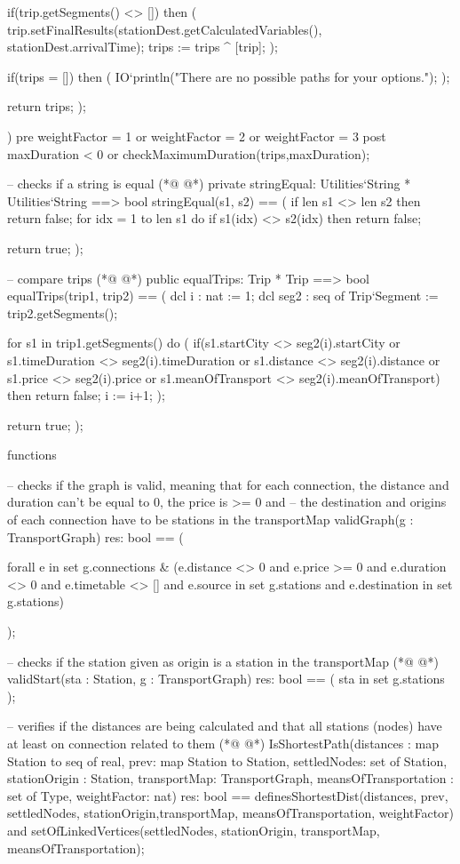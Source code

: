 \begin{vdmpp}[breaklines=true]
   if(trip.getSegments() <> []) then (
      trip.setFinalResults(stationDest.getCalculatedVariables(), stationDest.arrivalTime);
     trips := trips ^ [trip];
   );
   
   if(trips = []) then (
     IO`println("There are no possible paths for your options."); 
   );
   
   return trips;
  );
  
 )
 pre weightFactor = 1 or weightFactor = 2 or weightFactor = 3
 post maxDuration < 0 or checkMaximumDuration(trips,maxDuration);
 
 -- checks if a string is equal
(*@
\label{stringEqual:474}
@*)
 private stringEqual: Utilities`String * Utilities`String ==> bool
 stringEqual(s1, s2) ==
 (
  if len s1 <> len s2 then
   return false;
  for idx = 1 to len s1 do
   if s1(idx) <> s2(idx) then return false;
  
  return true;
 );
 
 -- compare trips
(*@
\label{equalTrips:486}
@*)
 public equalTrips: Trip * Trip ==> bool
 equalTrips(trip1, trip2) == (
   dcl i : nat := 1;
   dcl seg2 : seq of Trip`Segment := trip2.getSegments();
   
   for s1 in trip1.getSegments() do (
     if(s1.startCity <> seg2(i).startCity or s1.timeDuration <> seg2(i).timeDuration or s1.distance <> seg2(i).distance or s1.price <> seg2(i).price or s1.meanOfTransport <> seg2(i).meanOfTransport) then
       return false;
     i := i+1;
   );
   
   return true;
 );
 
 
functions
 
 -- checks if the graph is valid, meaning that for each connection, the distance and duration can't be equal to 0, the price is >= 0 and
 -- the destination and origins of each connection have to be stations in the transportMap
 validGraph(g : TransportGraph) res: bool ==
 (
  
  forall e in set g.connections & (e.distance <> 0 and e.price >= 0 and e.duration <> 0 and e.timetable <> [] 
  and e.source in set g.stations and e.destination in set g.stations)
  
 );
 
 -- checks if the station given as origin is a station in the transportMap
(*@
\label{validStart:514}
@*)
 validStart(sta : Station, g : TransportGraph) res: bool ==
 (
  sta in set g.stations
 );
 
 -- verifies if the distances are being calculated and that all stations (nodes) have at least on connection related to them
(*@
\label{IsShortestPath:520}
@*)
 IsShortestPath(distances : map Station to seq of real, prev: map Station to Station, settledNodes: set of Station, stationOrigin : Station, transportMap: TransportGraph, meansOfTransportation : set of Type, weightFactor: nat) res: bool ==
  definesShortestDist(distances, prev, settledNodes, stationOrigin,transportMap, meansOfTransportation, weightFactor) 
  and setOfLinkedVertices(settledNodes, stationOrigin, transportMap, meansOfTransportation);
 

\end{vdmpp}
